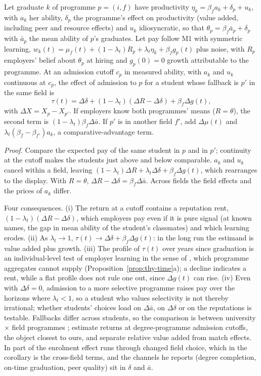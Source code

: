 \begin{thycor}\label{cor:thy-cutoff}
Let graduate $k$ of programme $p=(i,f)$ have productivity $\eta_k=\beta_fa_k+\delta_p+u_k$, with $a_k$ her ability,
$\delta_p$ the programme's effect on productivity (value added, including peer and resource effects) and $u_k$
idiosyncratic, so that $\theta_p=\beta_f\bar a_p+\delta_p$ with $\bar a_p$ the mean ability of $p$'s graduates. Let
pay follow M1 with symmetric learning, $w_k(t)=\mu_f(t)+(1-\lambda_t)R_p+\lambda_t\eta_k+\beta_fg_p(t)$ plus noise,
with $R_p$ employers' belief about $\theta_p$ at hiring and $g_p(0)=0$ growth attributable to the programme. At an
admission cutoff $c_p$ in measured ability, with $a_k$ and $u_k$ continuous at $c_p$, the effect of admission to $p$
for a student whose fallback is $p'$ in the same field is
\[
\tau(t)=\Delta\delta+(1-\lambda_t)(\Delta R-\Delta\delta)+\beta_f\Delta g(t),
\]
with $\Delta X=X_p-X_{p'}$. If employers know both programmes' means ($R=\theta$), the second term is
$(1-\lambda_t)\beta_f\Delta\bar a$. If $p'$ is in another field $f'$, add $\Delta\mu(t)$ and
$\lambda_t(\beta_f-\beta_{f'})a_k$, a comparative-advantage term.
\end{thycor}

\emph{Proof.} Compare the expected pay of the same student in $p$ and in $p'$; continuity at the cutoff makes the
students just above and below comparable. $a_k$ and $u_k$ cancel within a field, leaving
$(1-\lambda_t)\Delta R+\lambda_t\Delta\delta+\beta_f\Delta g(t)$, which rearranges to the display. With $R=\theta$,
$\Delta R-\Delta\delta=\beta_f\Delta\bar a$. Across fields the field effects and the prices of $a_k$ differ. \thyqed

Four consequences. (i) The return at a cutoff contains a reputation rent, $(1-\lambda_t)(\Delta R-\Delta\delta)$,
which employers pay even if it is pure signal (at known names, the gap in mean ability of the student's classmates)
and which learning erodes. (ii) As $\lambda_t\to1$, $\tau(t)\to\Delta\delta+\beta_f\Delta g(t)$: in the long run the
estimand is value added plus growth. (iii) The profile of $\tau(t)$ over years since graduation is an individual-level
test of employer learning in the sense of \citet{altonji2001employer}, which programme aggregates cannot supply
(Proposition~\ref{prop:thy-time}a); a decline indicates a rent, while a flat profile does not rule one out, since
$\Delta g(t)$ can rise. (iv) Even with $\Delta\delta=0$, admission to a more selective programme raises pay over the
horizons where $\lambda_t<1$, so a student who values selectivity is not thereby irrational; whether students' choices
load on $\Delta\bar a$, on $\Delta\delta$ or on the reputations is testable. Fallbacks differ across students, so the
comparison is between university $\times$ field programmes \citep{kirkeboen2016field}; \citet{hastings2013some}
estimate returns at degree-programme admission cutoffs, the object closest to ours, and \citet{mountjoy2021returns}
separate relative value added from match effects. In \citet{anelli2020returns} part of the enrolment effect runs
through changed field choice, which in the corollary is the cross-field terms, and the channels he reports (degree
completion, on-time graduation, peer quality) sit in $\delta$ and $\bar a$.

